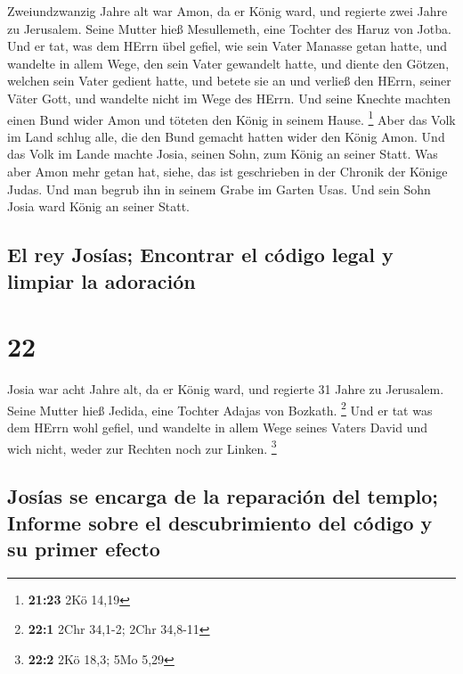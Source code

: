  Zweiundzwanzig Jahre alt war Amon, da er König ward, und
regierte zwei Jahre zu Jerusalem. Seine Mutter hieß Mesullemeth, eine
Tochter des Haruz von Jotba.  Und er tat, was dem HErrn
übel gefiel, wie sein Vater Manasse getan hatte,  und
wandelte in allem Wege, den sein Vater gewandelt hatte, und diente den
Götzen, welchen sein Vater gedient hatte, und betete sie an
 und verließ den HErrn, seiner Väter Gott, und wandelte
nicht im Wege des HErrn.  Und seine Knechte machten einen
Bund wider Amon und töteten den König in seinem Hause. \footnote{\textbf{21:23}
  2Kö 14,19}  Aber das Volk im Land schlug alle, die den
Bund gemacht hatten wider den König Amon. Und das Volk im Lande machte
Josia, seinen Sohn, zum König an seiner Statt.  Was aber
Amon mehr getan hat, siehe, das ist geschrieben in der Chronik der
Könige Judas.  Und man begrub ihn in seinem Grabe im
Garten Usas. Und sein Sohn Josia ward König an seiner Statt.

\hypertarget{el-rey-josuxedas-encontrar-el-cuxf3digo-legal-y-limpiar-la-adoraciuxf3n}{%
\subsection{El rey Josías; Encontrar el código legal y limpiar la
adoración}\label{el-rey-josuxedas-encontrar-el-cuxf3digo-legal-y-limpiar-la-adoraciuxf3n}}

\hypertarget{section-21}{%
\section{22}\label{section-21}}

 Josia war acht Jahre alt, da er König ward, und regierte
31 Jahre zu Jerusalem. Seine Mutter hieß Jedida, eine Tochter Adajas von
Bozkath. \footnote{\textbf{22:1} 2Chr 34,1-2; 2Chr 34,8-11}
 Und er tat was dem HErrn wohl gefiel, und wandelte in
allem Wege seines Vaters David und wich nicht, weder zur Rechten noch
zur Linken. \footnote{\textbf{22:2} 2Kö 18,3; 5Mo 5,29}

\hypertarget{josuxedas-se-encarga-de-la-reparaciuxf3n-del-templo-informe-sobre-el-descubrimiento-del-cuxf3digo-y-su-primer-efecto}{%
\subsection{Josías se encarga de la reparación del templo; Informe sobre
el descubrimiento del código y su primer
efecto}\label{josuxedas-se-encarga-de-la-reparaciuxf3n-del-templo-informe-sobre-el-descubrimiento-del-cuxf3digo-y-su-primer-efecto}}


